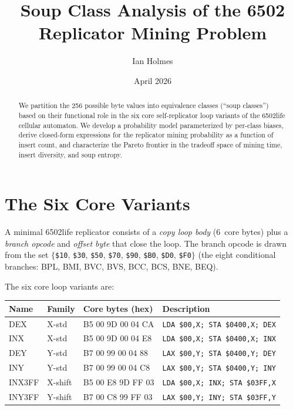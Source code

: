 \documentclass{article}
\title{Soup Class Analysis of the 6502 Replicator Mining Problem}
\author{Ian Holmes}
\date{April 2026}
\newcommand{\hex}[1]{\texttt{\$#1}}
\newcommand{\opcode}[1]{\texttt{#1}}
\begin{document}
\maketitle

\begin{abstract}
We partition the 256 possible byte values into equivalence classes
(``soup classes'') based on their functional role in the six core
self-replicator loop variants of the 6502life cellular automaton.
We develop a probability model parameterized by per-class biases,
derive closed-form expressions for the replicator mining probability
as a function of insert count, and characterize the Pareto frontier
in the tradeoff space of mining time, insert diversity, and soup entropy.
\end{abstract}

\tableofcontents

\section{The Six Core Variants}
\label{sec:variants}

A minimal 6502life replicator consists of a \emph{copy loop body}
(6~core bytes) plus a \emph{branch opcode} and \emph{offset byte}
that close the loop.  The branch opcode is drawn from the set
$\{$\hex{10}, \hex{30}, \hex{50}, \hex{70}, \hex{90}, \hex{B0},
\hex{D0}, \hex{F0}$\}$ (the eight conditional branches:
BPL, BMI, BVC, BVS, BCC, BCS, BNE, BEQ).

The six core loop variants are:

\begin{center}
\begin{tabular}{@{}llll@{}}
\toprule
\textbf{Name} & \textbf{Family} & \textbf{Core bytes (hex)} & \textbf{Description} \\
\midrule
DEX     & X-std   & B5 00 9D 00 04 CA & \opcode{LDA \$00,X; STA \$0400,X; DEX} \\
INX     & X-std   & B5 00 9D 00 04 E8 & \opcode{LDA \$00,X; STA \$0400,X; INX} \\
DEY     & Y-std   & B7 00 99 00 04 88 & \opcode{LAX \$00,Y; STA \$0400,Y; DEY} \\
INY     & Y-std   & B7 00 99 00 04 C8 & \opcode{LAX \$00,Y; STA \$0400,Y; INY} \\
INX3FF  & X-shift & B5 00 E8 9D FF 03 & \opcode{LDA \$00,X; INX; STA \$03FF,X} \\
INY3FF  & Y-shift & B7 00 C8 99 FF 03 & \opcode{LAX \$00,Y; INY; STA \$03FF,Y} \\
\bottomrule
\end{tabular}
\end{center}
\end{document}
